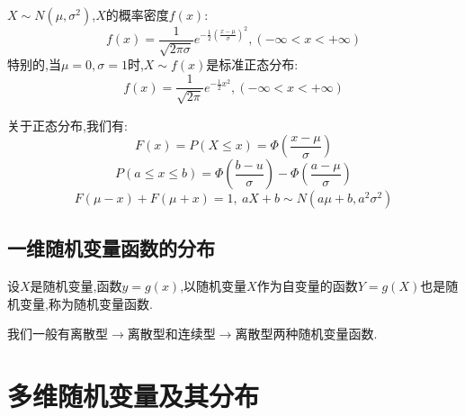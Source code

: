 \begin{definition}[常见连续型随机变量分布]
	$X\sim N(\mu,\sigma^2)$,$X$的概率密度$f(x)$: 
	$$f(x)=\dfrac{1}{\sqrt{2\pi\sigma}}e^{-\frac{1}{2}(\frac{x-\mu}{\sigma})^2},(-\infty<x<+\infty) $$
	特别的,当$\mu=0,\sigma=1$时,$X\sim f(x)$是标准正态分布: 
	$$f(x)=\dfrac{1}{\sqrt{2\pi}}e^{-\frac{1}{2}x^2},(-\infty<x<+\infty)$$
	
	关于正态分布,我们有: 
	$$F(x)=P(X\leq x)=\varPhi(\dfrac{x-\mu}{\sigma})$$
	$$P(a\leq x\leq b)=\varPhi(\dfrac{b-u}{\sigma})-\varPhi(\dfrac{a-\mu}{\sigma})$$
	$$F(\mu-x)+F(\mu+x)=1,\ aX+b\sim N(a\mu+b,a^2\sigma^2)$$
	\begin{figure}[H]
		\centering  %
	\end{figure}
\end{definition}
\section{一维随机变量函数的分布}
\begin{definition}
	设$X$是随机变量,函数$y=g(x)$,以随机变量$X$作为自变量的函数$Y=g(X)$也是随机变量,称为随机变量函数.
	
	我们一般有离散型$\rightarrow$离散型和连续型$\rightarrow$离散型两种随机变量函数.
\end{definition}
\chapter{多维随机变量及其分布}

